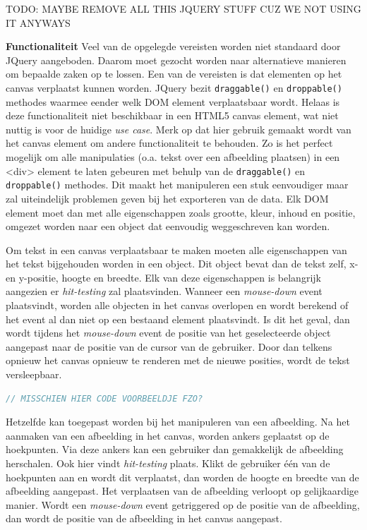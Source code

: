 TODO: MAYBE REMOVE ALL THIS JQUERY STUFF CUZ WE NOT USING IT ANYWAYS

\textbf{Functionaliteit} \break
Veel van de opgelegde vereisten worden niet standaard door JQuery aangeboden. Daarom moet gezocht worden naar alternatieve manieren om bepaalde zaken op te lossen. Een van de vereisten is dat elementen op het canvas verplaatst kunnen worden. JQuery bezit \lstinline{draggable()} en \lstinline{droppable()} methodes waarmee eender welk DOM element verplaatsbaar wordt. Helaas is deze functionaliteit niet beschikbaar in een HTML5 canvas element, wat niet nuttig is voor de huidige \textit{use case}. Merk op dat hier gebruik gemaakt wordt van het canvas element om andere functionaliteit te behouden. Zo is het perfect mogelijk om alle manipulaties (o.a. tekst over een afbeelding plaatsen) in een <div> element te laten gebeuren met behulp van de \lstinline{draggable()} en \lstinline{droppable()} methodes. Dit maakt het manipuleren een stuk eenvoudiger maar zal uiteindelijk problemen geven bij het exporteren van de data. Elk DOM element moet dan met alle eigenschappen zoals grootte, kleur, inhoud en positie, omgezet worden naar een object dat eenvoudig weggeschreven kan worden. 

Om tekst in een canvas verplaatsbaar te maken moeten alle eigenschappen van het tekst bijgehouden worden in een object. Dit object bevat dan de tekst zelf, x-en y-positie, hoogte en breedte. Elk van deze eigenschappen is belangrijk aangezien er \textit{hit-testing} zal plaatsvinden. Wanneer een \textit{mouse-down} event plaatsvindt, worden alle objecten in het canvas overlopen en wordt berekend of het event al dan niet op een bestaand element plaatsvindt. Is dit het geval, dan wordt tijdens het \textit{mouse-down} event de positie van het geselecteerde object aangepast naar de positie van de cursor van de gebruiker. Door dan telkens opnieuw het canvas opnieuw te renderen met de nieuwe posities, wordt de tekst versleepbaar.

\begin{lstlisting}[language=javascript]
// MISSCHIEN HIER CODE VOORBEELDJE FZO?
\end{lstlisting}

Hetzelfde kan toegepast worden bij het manipuleren van een afbeelding. Na het aanmaken van een afbeelding in het canvas, worden ankers geplaatst op de hoekpunten. Via deze ankers kan een gebruiker dan gemakkelijk de afbeelding herschalen. Ook hier vindt \textit{hit-testing} plaats. Klikt de gebruiker \'{e}\'{e}n van de hoekpunten aan en wordt dit verplaatst, dan worden de hoogte en breedte van de afbeelding aangepast. Het verplaatsen van de afbeelding verloopt op gelijkaardige manier. Wordt een \textit{mouse-down} event getriggered op de positie van de afbeelding, dan wordt de positie van de afbeelding in het canvas aangepast. 

